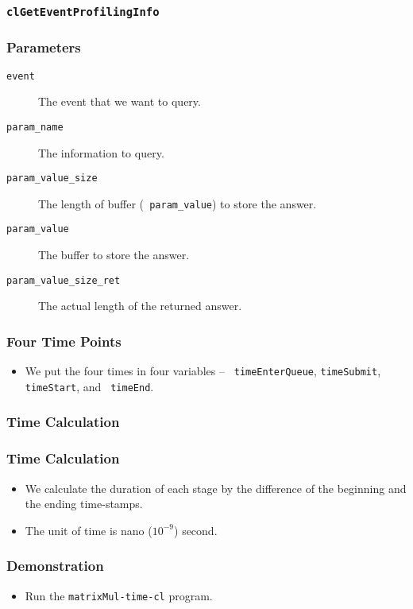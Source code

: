 \documentclass{beamer}
\begin{document}
\begin{frame}
  \frametitle{\tt clGetEventProfilingInfo}
\end{frame}

\begin{frame}
  \frametitle{Parameters}
  \begin{description}
  \item [\tt event] The event that we want to query.
  \item [\tt param\_name] The information to query.
  \item [\tt param\_value\_size] The length of buffer ({\tt
    param\_value}) to store the answer.
  \item [\tt param\_value] The buffer to store the answer.
  \item [\tt param\_value\_size\_ret] The actual length of the
    returned answer.
  \end{description}
\end{frame}

\begin{frame}
  \frametitle{Four Time Points}
  \begin{itemize}
  \item We put the four times in four variables -- {\tt
    timeEnterQueue}, {\tt timeSubmit}, {\tt timeStart}, and {\tt
    timeEnd}.
  \end{itemize}
\end{frame}

\begin{frame}
  \frametitle{Time Calculation}
\end{frame}

\begin{frame}
  \frametitle{Time Calculation}
  \begin{itemize}
  \item We calculate the duration of each stage by the difference of
    the beginning and the ending time-stamps.
  \item The unit of time is nano ($10^{-9}$) second. 
  \end{itemize}
\end{frame}

\begin{frame}
\end{frame}

\begin{frame}
  \frametitle{Demonstration}
  \begin{itemize}
    \item Run the {\tt matrixMul-time-cl} program.
  \end{itemize}
\end{frame}
\end{document}
